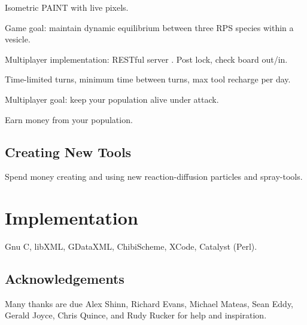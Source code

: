 \documentclass{acm_proc_article-sp}
\begin{document}
Isometric PAINT with live pixels.

Game goal: maintain dynamic equilibrium between three RPS species within a vesicle.

Multiplayer implementation: RESTful server \cite{rest}.
Post lock, check board out/in.

Time-limited turns, minimum time between turns, max tool recharge per day.

Multiplayer goal: keep your population alive under attack.

Earn money from your population.

\subsection{Creating New Tools}

Spend money creating and using new reaction-diffusion particles and spray-tools.

\section{Implementation}

Gnu C, libXML, GDataXML, ChibiScheme, XCode, Catalyst (Perl).

\subsection{Acknowledgements}

Many thanks are due Alex Shinn, Richard Evans, Michael Mateas, Sean Eddy, Gerald Joyce, Chris Quince,
and Rudy Rucker for help and inspiration.




\balancecolumns
\end{document}
